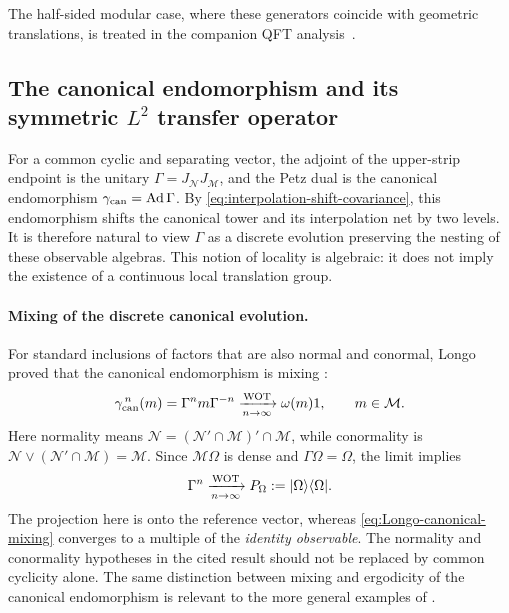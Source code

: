 \documentclass[a4paper,11pt]{article}
\theoremstyle{definition}
\newcommand{\mN}{\mathcal{N}}
\newcommand{\mM}{\mathcal{M}}
\begin{document}
The half-sided modular case, where these generators coincide
with geometric translations, is treated in
the companion QFT analysis~\cite{companionQFT}.

\subsection{The canonical endomorphism and its symmetric $L^2$ transfer operator}
\label{subsec:emergent-transfer-time}

For a common cyclic and separating vector, the adjoint of the upper-strip
endpoint is the unitary $\Gamma=J_{\mN}J_{\mM}$, and the Petz dual is the
canonical endomorphism $\gamma_{\rm can}=\operatorname{Ad}\Gamma$.
By \eqref{eq:interpolation-shift-covariance}, this endomorphism shifts the
canonical tower and its interpolation net by two levels. It is therefore
natural to view $\Gamma$ as a discrete evolution preserving the nesting of
these observable algebras. This notion of locality is algebraic: it does
not imply the existence of a continuous local translation group.

\paragraph{Mixing of the discrete canonical evolution.}
For standard inclusions of factors that are also normal and conormal,
Longo proved that the canonical endomorphism is mixing
\cite{Longo1984FactorialStoneWeierstrass,Longo1985Pseudonormalcy}:
\begin{equation}
    \gamma_{\rm can}^{\,n}(m)
    =\Gamma^n m\Gamma^{-n}
    \xrightarrow[n\to\infty]{\rm WOT}
    \omega(m)1,\qquad m\in\mM.
    \label{eq:Longo-canonical-mixing}
\end{equation}
Here normality means $\mN=(\mN'\cap\mM)'\cap\mM$, while
conormality is $\mN\vee(\mN'\cap\mM)=\mM$. Since $\mM\Omega$
is dense and $\Gamma\Omega=\Omega$, the limit implies
\begin{equation}
    \Gamma^n\xrightarrow[n\to\infty]{\rm WOT}
    P_\Omega:=|\Omega\rangle\langle\Omega|.
    \label{eq:Longo-Gamma-weak}
\end{equation}
The projection here is onto the reference vector, whereas
\eqref{eq:Longo-canonical-mixing} converges to a multiple of the
\emph{identity observable}. The normality and conormality hypotheses
in the cited result should not be replaced by common cyclicity alone.
The same distinction between mixing and ergodicity of the canonical
endomorphism is relevant to the more general examples of
\cite{LongoTanimotoUeda2019}.
\end{document}
